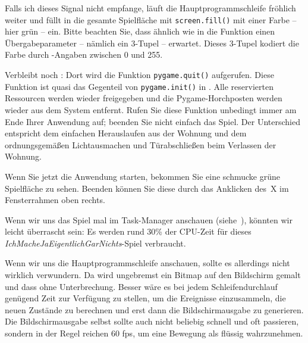 Falls ich dieses Signal nicht empfange, läuft die Hauptprogrammschleife fröhlich weiter und füllt in  die gesamte Spielfläche mit \texttt{screen.fill()} mit einer Farbe -- hier grün -- ein. Bitte beachten Sie, dass ähnlich wie in  die Funktion einen Übergabeparameter -- nämlich ein 3-Tupel -- erwartet. Dieses 3-Tupel kodiert die Farbe durch -Angaben zwischen 0 und 255.

Verbleibt noch : Dort wird die Funktion \texttt{pygame.quit()} aufgerufen. Diese Funktion ist quasi das Gegenteil von \texttt{pygame.init()} in . Alle reservierten Ressourcen werden wieder freigegeben und die Pygame-Horchposten werden wieder aus dem System entfernt. Rufen Sie diese Funktion unbedingt immer am Ende Ihrer Anwendung auf; beenden Sie nicht einfach das Spiel. Der Unterschied entspricht dem einfachen Herauslaufen aus der Wohnung und dem ordnungsgemäßen Lichtausmachen und Türabschließen beim Verlassen der Wohnung.  

Wenn Sie jetzt die Anwendung starten, bekommen Sie eine schmucke grüne Spielfläche zu sehen. Beenden können Sie diese durch das Anklicken des~X im Fensterrahmen oben rechts.


Wenn wir uns das Spiel mal im Task-Manager anschauen (siehe~), könnten wir leicht überrascht sein: Es werden rund 30\% der CPU-Zeit für dieses \emph{IchMacheJaEigentlichGarNichts}-Spiel verbraucht. 


Wenn wir uns die Hauptprogrammschleife anschauen, sollte es allerdings nicht wirklich verwundern. Da wird ungebremst ein Bitmap auf den Bildschirm gemalt und dass ohne Unterbrechung. Besser wäre es bei jedem Schleifendurchlauf genügend Zeit zur Verfügung zu stellen, um die Ereignisse einzusammeln, die neuen Zustände zu berechnen und erst dann die Bildschirmausgabe zu generieren. Die Bildschirmausgabe selbst sollte auch nicht beliebig schnell und oft passieren, sondern in der Regel reichen 60 \gls{fps}, um eine Bewegung als flüssig wahrzunehmen. 


